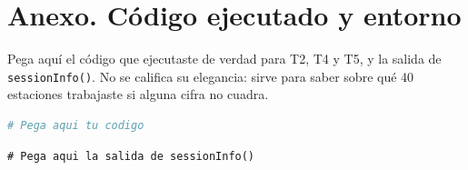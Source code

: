 \documentclass[11pt,a4paper,oneside]{article}
\begin{document}
\newpage
\section*{Anexo. Código ejecutado y entorno}

Pega aquí el código que ejecutaste de verdad para T2, T4 y T5, y la salida de
\texttt{sessionInfo()}. No se califica su elegancia: sirve para saber sobre qué 40 estaciones
trabajaste si alguna cifra no cuadra.

\begin{lstlisting}[language=R]
# Pega aqui tu codigo
\end{lstlisting}

\begin{lstlisting}
# Pega aqui la salida de sessionInfo()
\end{lstlisting}
\end{document}
